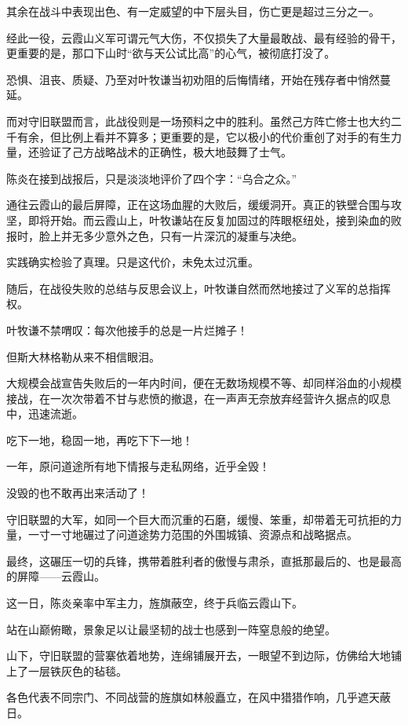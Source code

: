 其余在战斗中表现出色、有一定威望的中下层头目，伤亡更是超过三分之一。

经此一役，云霞山义军可谓元气大伤，不仅损失了大量最敢战、最有经验的骨干，更重要的是，那口下山时“欲与天公试比高”的心气，被彻底打没了。

恐惧、沮丧、质疑、乃至对叶牧谦当初劝阻的后悔情绪，开始在残存者中悄然蔓延。

而对守旧联盟而言，此战役则是一场预料之中的胜利。虽然己方阵亡修士也大约二千有余，但比例上看并不算多；更重要的是，它以极小的代价重创了对手的有生力量，还验证了己方战略战术的正确性，极大地鼓舞了士气。

陈炎在接到战报后，只是淡淡地评价了四个字：“乌合之众。”

通往云霞山的最后屏障，正在这场血腥的大败后，缓缓洞开。真正的铁壁合围与攻坚，即将开始。而云霞山上，叶牧谦站在反复加固过的阵眼枢纽处，接到染血的败报时，脸上并无多少意外之色，只有一片深沉的凝重与决绝。

实践确实检验了真理。只是这代价，未免太过沉重。

随后，在战役失败的总结与反思会议上，叶牧谦自然而然地接过了义军的总指挥权。

叶牧谦不禁喟叹：每次他接手的总是一片烂摊子！

但斯大林格勒从来不相信眼泪。

\vspace{2em}

大规模会战宣告失败后的一年内时间，便在无数场规模不等、却同样浴血的小规模接战，在一次次带着不甘与悲愤的撤退，在一声声无奈放弃经营许久据点的叹息中，迅速流逝。

吃下一地，稳固一地，再吃下下一地！

一年，原问道途所有地下情报与走私网络，近乎全毁！

没毁的也不敢再出来活动了！

守旧联盟的大军，如同一个巨大而沉重的石磨，缓慢、笨重，却带着无可抗拒的力量，一寸一寸地碾过了问道途势力范围的外围城镇、资源点和战略据点。

最终，这碾压一切的兵锋，携带着胜利者的傲慢与肃杀，直抵那最后的、也是最高的屏障——云霞山。

这一日，陈炎亲率中军主力，旌旗蔽空，终于兵临云霞山下。

站在山巅俯瞰，景象足以让最坚韧的战士也感到一阵窒息般的绝望。

山下，守旧联盟的营寨依着地势，连绵铺展开去，一眼望不到边际，仿佛给大地铺上了一层铁灰色的毡毯。

各色代表不同宗门、不同战营的旌旗如林般矗立，在风中猎猎作响，几乎遮天蔽日。

